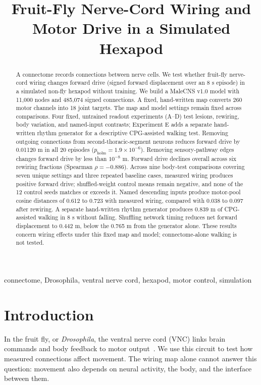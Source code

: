 \documentclass[conference]{IEEEtran}
\title{Fruit-Fly Nerve-Cord Wiring and Motor Drive in a Simulated Hexapod}
\author{\IEEEauthorblockN{Puneeth Pradeep}
\IEEEauthorblockA{High School Student\\
\textit{Nolensville High School}\\
Nolensville, TN, USA\\
puneethp2009@gmail.com}}
\begin{document}
\maketitle

\begin{abstract}
A connectome records connections between nerve cells. We test whether fruit-fly nerve-cord wiring changes forward drive (signed forward displacement over an 8 s episode) in a simulated non-fly hexapod without training. We build a MaleCNS v1.0 model with 11,000 nodes and 485,074 signed connections. A fixed, hand-written map converts 260 motor channels into 18 joint targets. The map and model settings remain fixed across comparisons. Four fixed, untrained readout experiments (A--D) test lesions, rewiring, body variation, and named-input contrasts; Experiment E adds a separate hand-written rhythm generator for a descriptive CPG-assisted walking test. Removing outgoing connections from second-thoracic-segment neurons reduces forward drive by 0.01120 m in all 20 episodes ($p_{\mathrm{holm}} = 1.9 \times 10^{-6}$). Removing sensory-pathway edges changes forward drive by less than $10^{-8}$ m. Forward drive declines overall across six rewiring fractions (Spearman $\rho = -0.886$). Across nine body-test comparisons covering seven unique settings and three repeated baseline cases, measured wiring produces positive forward drive; shuffled-weight control means remain negative, and none of the 12 control seeds matches or exceeds it. Named descending inputs produce motor-pool cosine distances of 0.612 to 0.723 with measured wiring, compared with 0.038 to 0.097 after rewiring. A separate hand-written rhythm generator produces 0.839 m of CPG-assisted walking in 8 s without falling. Shuffling network timing reduces net forward displacement to 0.442 m, below the 0.765 m from the generator alone. These results concern wiring effects under this fixed map and model; connectome-alone walking is not tested.
\end{abstract}
\begin{IEEEkeywords}
connectome, Drosophila, ventral nerve cord, hexapod, motor control, simulation
\end{IEEEkeywords}

\section{Introduction}
In the fruit fly, or \textit{Drosophila}, the ventral nerve cord (VNC) links brain commands and body feedback to motor output~\cite{takemura2024manc,cheong2026premotor}. We use this circuit to test how measured connections affect movement. The wiring map alone cannot answer this question: movement also depends on neural activity, the body, and the interface between them.
\end{document}
